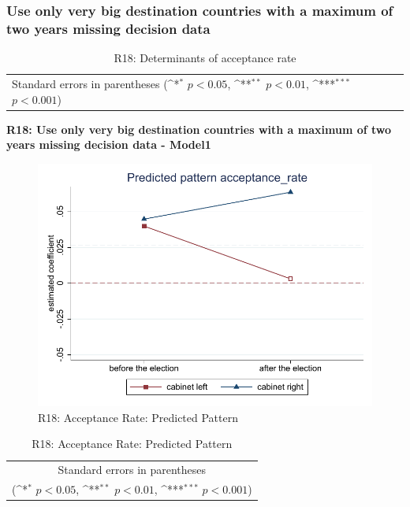 \documentclass[10pt,a4paper]{scrartcl}
\begin{document}


\clearpage
\FloatBarrier
\subsubsection{Use only very big destination countries with a maximum of two years missing decision data}
\begin{table}[!ht]\centering
	\renewcommand{\arraystretch}{1.25}
	\small
	\def\sym#1{\ifmmode^{#1}\else\(^{#1}\)\fi}
	\caption{R18: Determinants of acceptance rate}
	\begin{tabular}{l*{3}{c}}
		\hline\hline
		
		\hline\hline
		\multicolumn{4}{l}{\footnotesize Standard errors in parentheses (\sym{*} \(p<0.05\), \sym{**} \(p<0.01\), \sym{***} \(p<0.001\))}\\
	\end{tabular}
\end{table}

\clearpage
\textbf{R18: Use only very big destination countries with a maximum of two years missing decision data - Model1}
\begin{figure}[!ht]
	\centering
	\includegraphics[width=1\textwidth]{figures_edited/acceptance_rate_graph1_R18.pdf}
	\caption{R18: Acceptance Rate: Predicted Pattern}
\end{figure}

\begin{table}[!ht]\centering
	\renewcommand{\arraystretch}{1.25}
	\def\sym#1{\ifmmode^{#1}\else\(^{#1}\)\fi}
	\caption{R18: Acceptance Rate: Predicted Pattern}
	\begin{tabular}{l*{2}{c}}
		\hline\hline
		
		\hline\hline
		\multicolumn{3}{c}{\footnotesize Standard errors in parentheses} \\
		\multicolumn{3}{c}{\footnotesize (\sym{*} \(p<0.05\), \sym{**} \(p<0.01\), \sym{***} \(p<0.001\))}\\
	\end{tabular}
\end{table}
\end{document}
